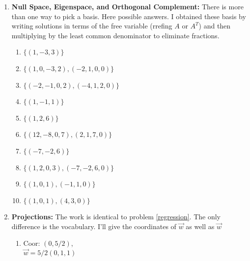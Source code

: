 {\begin{multicols}{2}
\begin{enumerate}
\begin{enumerate}
\item  
$\vec v: (3, 0)  $,
$\vec w: (-(6/5), 7/5)$

\item  
$\vec v: (-2, 5/2) $,
$\vec w: $ not in space.

\item  
$\vec v: (-3, 2)$,
$\vec w: (-(12/5), 9/5)$

\item  
$\vec v: (-4, 4, -2)$,
$\vec w: (0, -3, 5)$

\item  
$\vec v: (1, 2, -3) $,
$\vec w: (3, -5, -1) $

\end{enumerate}



\item  {\bf Null Space, Eigenspace, and Orthogonal Complement:} There is more than one way to pick a basis. Here possible answers. I obtained these basis by writing solutions in terms of the free variable (rrefing $A$ or $A^T$) and then multiplying by the least common denominator to eliminate fractions.
\begin{enumerate}
\item $\{ (1, -3, 3)\}$
\item $\{ (1, 0, -3, 2), (-2, 1, 0, 0)\}$
\item $\{ (-2, -1, 0, 2), (-4, 1, 2, 0)\}$
\item $\{ (1, -1, 1)\}$

\item $\{ (1, 2, 6)\}$
\item $\{ (12, -8, 0, 7), (2, 1, 7, 0)\}$
\item $\{ (-7, -2, 6)\}$
\item $\{ (1, 2, 0, 3), (-7, -2, 6, 0)\}$

\item $\{ (1, 0, 1), (-1, 1, 0)\}$
\item $\{ (1, 0, 1), (4, 3, 0)\}$

\end{enumerate}



\item {\bf Projections:} The work is identical to problem \ref{regression}. The only difference is the vocabulary. I'll give the coordinates of $\vec w$ as well as $\vec w$
\begin{enumerate}
\item 
Coor: $(0,5/2)$,\\
$\vec w = 5/2(0,1,1)$


\end{enumerate}
\end{enumerate}
\end{multicols}}
